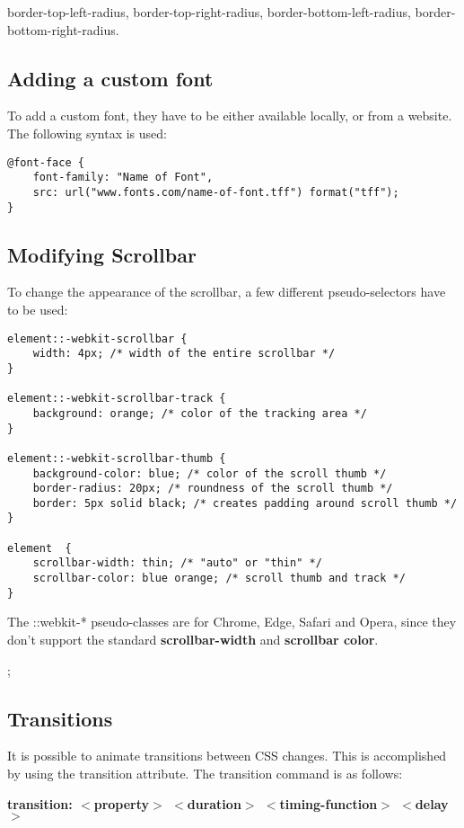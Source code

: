 \documentclass[portfolio.tex]{subfiles}
\begin{document}
				border-top-left-radius, border-top-right-radius, border-bottom-left-radius, border-bottom-right-radius. \autocite{w3-border-top-left}\\
			\subsection{Adding a custom font}
				\label{css-custom-font}
				To add a custom font, they have to be either available locally, or from a website. The following syntax is used:\\

				\begin{lstlisting}
@font-face {
	font-family: "Name of Font",
	src: url("www.fonts.com/name-of-font.tff") format("tff");
}
				\end{lstlisting}
			\autocite{moz-font-face}

			\subsection{Modifying Scrollbar}
			\label{modify-scrollbar}
			To change the appearance of the scrollbar, a few different pseudo-selectors have to be used:

			\begin{lstlisting}
element::-webkit-scrollbar {
	width: 4px; /* width of the entire scrollbar */
}

element::-webkit-scrollbar-track {
	background: orange; /* color of the tracking area */
}

element::-webkit-scrollbar-thumb {
	background-color: blue; /* color of the scroll thumb */
	border-radius: 20px; /* roundness of the scroll thumb */
	border: 5px solid black; /* creates padding around scroll thumb */
}

element  {
	scrollbar-width: thin; /* "auto" or "thin" */
	scrollbar-color: blue orange; /* scroll thumb and track */
}
			\end{lstlisting}

			The ::webkit-* pseudo-classes are for Chrome, Edge, Safari and Opera, since they don't support the standard \textbf{scrollbar-width} and \textbf{scrollbar color}.

			\autocite{w3-scroll};

			\subsection{Transitions}
				\label{css-transitions}
				It is possible to animate transitions between CSS changes. This is accomplished by using the transition attribute. The transition command is as follows:
				\begin{center}
					\textbf{transition: $<$property$>$ $<$duration$>$ $<$timing-function$>$ $<$delay$>$}
				\end{center}
\end{document}
